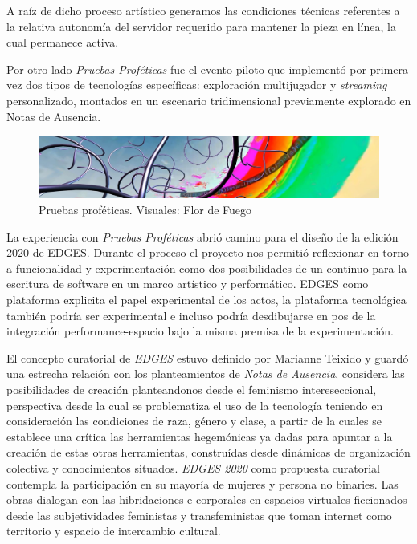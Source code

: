 A raíz de dicho proceso artístico generamos las condiciones técnicas referentes a la relativa autonomía del servidor requerido para mantener la pieza en línea, la cual permanece activa.

Por otro lado \textit{Pruebas Proféticas} fue el evento piloto que implementó por primera vez dos tipos de tecnologías específicas: exploración multijugador y \textit{streaming} personalizado, montados en un escenario tridimensional previamente explorado en Notas de Ausencia. 

\begin{figure}[H]
  \includegraphics[width=\textwidth]{img/pruebasprofeticas.jpg}
  \caption{Pruebas proféticas. Visuales: Flor de Fuego}
\end{figure}



 \color{Fuchsia}

La experiencia con \textit{Pruebas Proféticas} abrió camino para el diseño de la edición 2020 de EDGES. Durante el proceso el proyecto nos permitió reflexionar en torno a funcionalidad y experimentación como dos posibilidades de un continuo para la escritura de software en un marco artístico y performático. EDGES como plataforma explicita el papel experimental de los actos, la plataforma tecnológica también podría ser experimental e incluso podría desdibujarse en pos de la integración performance-espacio bajo la misma premisa de la experimentación.

\color{black}

El concepto curatorial de \textit{EDGES} estuvo definido por Marianne Teixido y guardó una estrecha relación con los planteamientos de \textit{Notas de Ausencia}, considera las posibilidades de creación planteandonos desde el feminismo intereseccional, perspectiva desde la cual se problematiza el uso de la tecnología teniendo en consideración las condiciones de raza, género y clase, a partir de la cuales se establece una crítica las herramientas hegemónicas ya dadas para apuntar a la creación de estas otras herramientas, construídas desde dinámicas de organización colectiva y conocimientos situados. \textit{EDGES 2020} como propuesta curatorial contempla la participación en su mayoría de mujeres y persona no binaries. Las obras dialogan con las hibridaciones e-corporales en espacios virtuales ficcionados desde las subjetividades feministas y transfeministas que toman internet como territorio y espacio de intercambio cultural.

